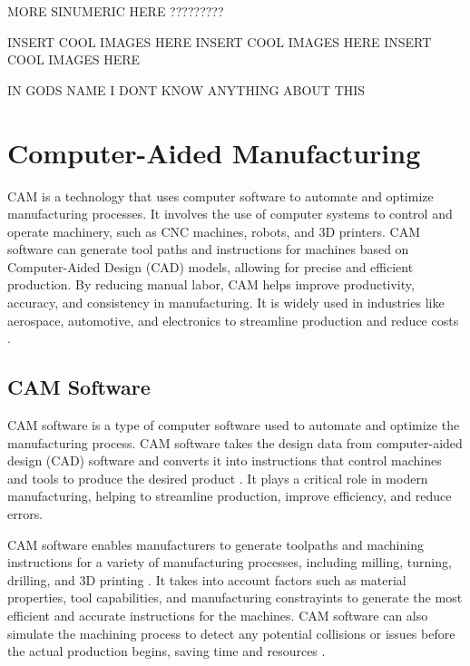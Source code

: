 MORE SINUMERIC HERE \cite{sinumericmanual} ?????????


INSERT COOL IMAGES HERE\newline
INSERT COOL IMAGES HERE\newline
INSERT COOL IMAGES HERE\newline

IN GODS NAME I DONT KNOW ANYTHING ABOUT THIS 

\section{Computer-Aided Manufacturing}\label{CAMmain}

CAM is a technology that uses computer software to automate and optimize manufacturing processes. It involves the use of computer systems to control and operate machinery, such as CNC machines, robots, and 3D printers. CAM software can generate tool paths and instructions for machines based on Computer-Aided Design (CAD) models, allowing for precise and efficient production. By reducing manual labor, CAM helps improve productivity, accuracy, and consistency in manufacturing. It is widely used in industries like aerospace, automotive, and electronics to streamline production and reduce costs \cite{Bi.2021}.

\subsection{CAM Software}

CAM software is a type of computer software used to automate and optimize the manufacturing process. CAM software takes the design data from computer-aided design (CAD) software and converts it into instructions that control machines and tools to produce the desired product \cite{Bi.2021}. It plays a critical role in modern manufacturing, helping to streamline production, improve efficiency, and reduce errors.

CAM software enables manufacturers to generate toolpaths and machining instructions for a variety of manufacturing processes, including milling, turning, drilling, and 3D printing \cite{Kumar.2019}. It takes into account factors such as material properties, tool capabilities, and manufacturing constrayints to generate the most efficient and accurate instructions for the machines. CAM software can also simulate the machining process to detect any potential collisions or issues before the actual production begins, saving time and resources \cite{Bui.2019}.

